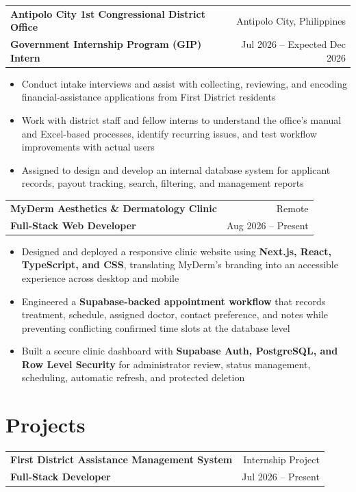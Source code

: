 \documentclass[a4paper,10pt]{article}
\makeatletter
\newenvironment{highlights}{
    \begin{itemize}[
        topsep=0cm,
        parsep=0cm,
        partopsep=0cm,
        itemsep=0.01cm,
        leftmargin=0.48cm
    ]
}{
    \end{itemize}
}
\newcommand{\entryhead}[4]{%
\vspace{0.16cm}
\begin{tabularx}{\linewidth}{@{}X r@{}}
\textbf{#1} & #2 \\
\textbf{#3} & #4 \\
\end{tabularx}%
\vspace{-0.34cm}
}
\makeatother
\begin{document}
\entryhead
{Antipolo City 1st Congressional District Office}
{Antipolo City, Philippines}
{Government Internship Program (GIP) Intern}
{Jul 2026 -- Expected Dec 2026}

\begin{highlights}
    \item Conduct intake interviews and assist with collecting, reviewing, and
    encoding financial-assistance applications from First District residents

    \item Work with district staff and fellow interns to understand the office's
    manual and Excel-based processes, identify recurring issues, and test
    workflow improvements with actual users

    \item Assigned to design and develop an internal database system for applicant
    records, payout tracking, search, filtering, and management reports
\end{highlights}

\entryhead
{MyDerm Aesthetics \& Dermatology Clinic}
{Remote}
{Full-Stack Web Developer}
{Aug 2026 -- Present}

\begin{highlights}
    \item Designed and deployed a responsive clinic website using
    \textbf{Next.js, React, TypeScript, and CSS}, translating MyDerm's branding
    into an accessible experience across desktop and mobile

    \item Engineered a \textbf{Supabase-backed appointment workflow} that records
    treatment, schedule, assigned doctor, contact preference, and notes while
    preventing conflicting confirmed time slots at the database level

    \item Built a secure clinic dashboard with
    \textbf{Supabase Auth, PostgreSQL, and Row Level Security} for administrator
    review, status management, scheduling, automatic refresh, and protected deletion
\end{highlights}

\section{Projects}

\vspace{-0.20cm}

\entryhead
{First District Assistance Management System}
{Internship Project}
{Full-Stack Developer}
{Jul 2026 -- Present}
\end{document}
